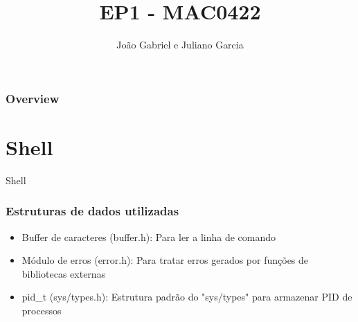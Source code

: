 \documentclass{beamer}
\title[EP1]{EP1 - MAC0422} %
\author{João Gabriel e Juliano Garcia} %
\institute[IME- USP] %
{
Instituto de Matemática e Estatística - USP \\ %
}
\date{} %
\begin{document}
\begin{frame}
\titlepage %
\end{frame}

\begin{frame}
\frametitle{Overview} %
\tableofcontents %
\end{frame}


\section{Shell}

\begin{frame}
\begin{center}
\huge Shell
\end{center}
\end{frame}

\begin{frame}
\frametitle{Estruturas de dados utilizadas}
\begin{itemize}
\item Buffer de caracteres (buffer.h): Para ler a linha de comando
\item Módulo de erros (error.h): Para tratar erros gerados por funções de bibliotecas externas
\item pid\_t (sys/types.h): Estrutura padrão do "sys/types" para armazenar PID de processos
\end{itemize}
\end{frame}
\end{document}
